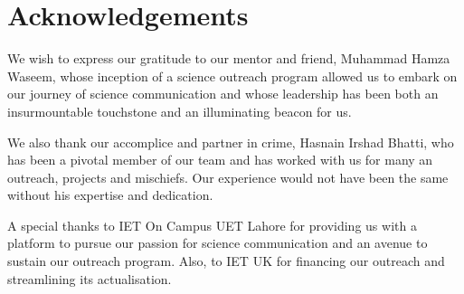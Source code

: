 \chapter*{Acknowledgements}

We wish to express our gratitude to our mentor and friend, Muhammad Hamza Waseem, whose inception of a science outreach program allowed us to embark on our journey of science communication and whose leadership has been both an insurmountable touchstone and an illuminating beacon for us.

We also thank our accomplice and partner in crime, Hasnain Irshad Bhatti, who has been a pivotal member of our team and has worked with us for many an outreach, projects and mischiefs. Our experience would not have been the same without his expertise and dedication.

A special thanks to IET On Campus UET Lahore for providing us with a platform to pursue our passion for science communication and an avenue to sustain our outreach program. Also, to IET UK for financing our outreach and streamlining its actualisation.
